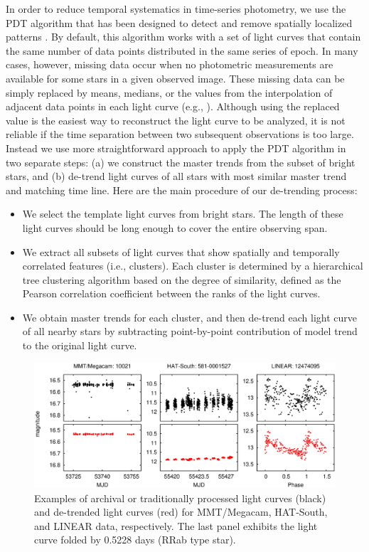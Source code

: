 In order to reduce temporal systematics in time-series photometry, we use the PDT algorithm that has been designed to detect and remove spatially localized patterns \citep{kim09}.  By default, this algorithm works with a set of light curves that contain the same number of data points distributed in the same series of epoch.  In many cases, however, missing data occur when no photometric measurements are available for some stars in a given observed image.  These missing data can be simply replaced by means, medians, or the values from the interpolation of adjacent data points in each light curve (e.g., \citealt{kov05, kim10}).  Although using the replaced value is the easiest way to reconstruct the light curve to be analyzed, it is not reliable if the time separation between two subsequent observations is too large.  Instead we use more straightforward approach to apply the PDT algorithm in two separate steps: (a) we construct the master trends from the subset of bright stars, and (b) de-trend light curves of all stars with most similar master trend and matching time line.  Here are the main procedure of our de-trending process: \begin{itemize}
\item{We select the template light curves from bright stars.  The length of these light curves should be long enough to cover the entire observing span.}

\item{We extract all subsets of light curves that show spatially and temporally correlated features (i.e., clusters).  Each cluster is determined by a hierarchical tree clustering algorithm based on the degree of similarity, defined as the Pearson correlation coefficient between the ranks of the light curves.}

\item{We obtain master trends for each cluster, and then de-trend each light curve of all nearby stars by subtracting point-by-point contribution of model trend to the original light curve.}
\end{itemize} 

\begin{figure}[!t]
\begin{center}
\includegraphics[scale=0.42]{part2/Chang_O07/O07_f2.eps}
\caption{Examples of archival or traditionally processed light curves (black) and de-trended light curves (red) for MMT/Megacam, HAT-South, and LINEAR data, respectively.  The last panel exhibits the light curve folded by 0.5228 days (RRab type star).}
\end{center}
\label{Fig2}
\end{figure}

